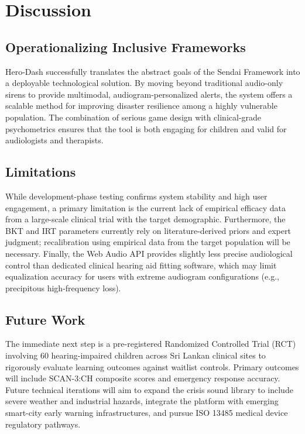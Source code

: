 \documentclass[conference]{IEEEtran}
\begin{document}
\section{Discussion}

\subsection{Operationalizing Inclusive Frameworks}
Hero-Dash successfully translates the abstract goals of the Sendai Framework \cite{b1} into a deployable technological solution. By moving beyond traditional audio-only sirens to provide multimodal, audiogram-personalized alerts, the system offers a scalable method for improving disaster resilience among a highly vulnerable population. The combination of serious game design with clinical-grade psychometrics ensures that the tool is both engaging for children and valid for audiologists and therapists.

\subsection{Limitations}
While development-phase testing confirms system stability and high user engagement, a primary limitation is the current lack of empirical efficacy data from a large-scale clinical trial with the target demographic. Furthermore, the BKT and IRT parameters currently rely on literature-derived priors and expert judgment; recalibration using empirical data from the target population will be necessary. Finally, the Web Audio API provides slightly less precise audiological control than dedicated clinical hearing aid fitting software, which may limit equalization accuracy for users with extreme audiogram configurations (e.g., precipitous high-frequency loss).

\subsection{Future Work}
The immediate next step is a pre-registered Randomized Controlled Trial (RCT) involving 60 hearing-impaired children across Sri Lankan clinical sites to rigorously evaluate learning outcomes against waitlist controls. Primary outcomes will include SCAN-3:CH composite scores and emergency response accuracy. Future technical iterations will aim to expand the crisis sound library to include severe weather and industrial hazards, integrate the platform with emerging smart-city early warning infrastructures, and pursue ISO 13485 medical device regulatory pathways.
\end{document}
